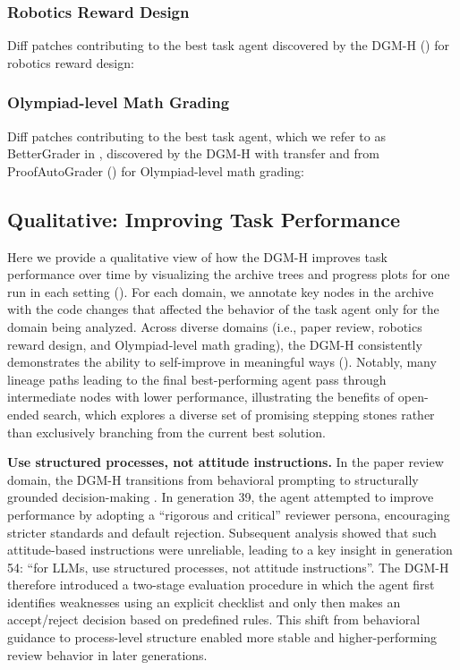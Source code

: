 \documentclass{article}
\begin{document}
\subsubsection{Robotics Reward Design}
\label{app:best-agents-genesis}
Diff patches contributing to the best task agent discovered by the DGM-H () for robotics reward design:


\subsubsection{Olympiad-level Math Grading}
\label{app:best-agents-imograding}
Diff patches contributing to the best task agent, which we refer to as BetterGrader in , discovered by the DGM-H with transfer and from ProofAutoGrader () for Olympiad-level math grading:


\subsection{Qualitative: Improving Task Performance}
\label{app:qual-task}

Here we provide a qualitative view of how the DGM-H improves task performance over time by visualizing the archive trees and progress plots for one run in each setting (). For each domain, we annotate key nodes in the archive with the code changes that affected the behavior of the task agent only for the domain being analyzed. Across diverse domains (i.e., paper review, robotics reward design, and Olympiad-level math grading), the DGM-H consistently demonstrates the ability to self-improve in meaningful ways (). Notably, many lineage paths leading to the final best-performing agent pass through intermediate nodes with lower performance, illustrating the benefits of open-ended search, which explores a diverse set of promising stepping stones rather than exclusively branching from the current best solution.

\textbf{Use structured processes, not attitude instructions.} In the paper review domain, the DGM-H transitions from behavioral prompting to structurally grounded decision-making . In generation 39, the agent attempted to improve performance by adopting a ``rigorous and critical'' reviewer persona, encouraging stricter standards and default rejection. Subsequent analysis showed that such attitude-based instructions were unreliable, leading to a key insight in generation 54: ``for LLMs, use structured processes, not attitude instructions''. The DGM-H therefore introduced a two-stage evaluation procedure in which the agent first identifies weaknesses using an explicit checklist and only then makes an accept/reject decision based on predefined rules. This shift from behavioral guidance to process-level structure enabled more stable and higher-performing review behavior in later generations.
\end{document}
